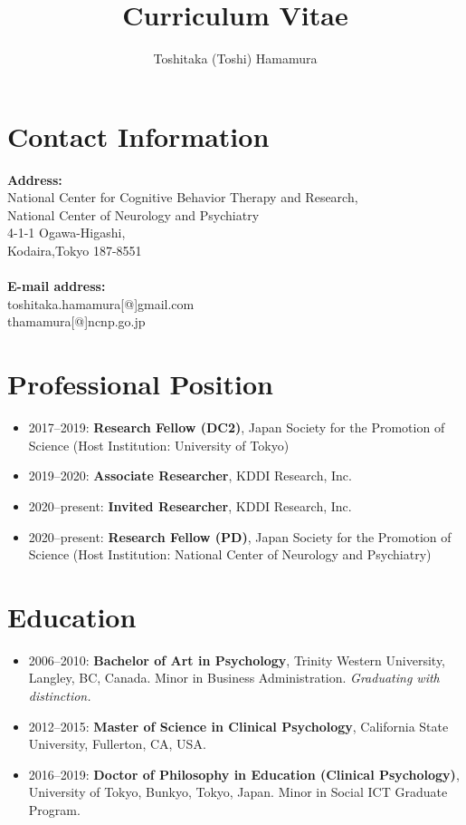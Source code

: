 \documentclass{article}
\begin{document}
\sloppy
\title{Curriculum Vitae}
\author{Toshitaka (Toshi) Hamamura}
\maketitle

\section{Contact Information}
\textbf{Address:}\\ 
National Center for Cognitive Behavior Therapy and Research,\\
National Center of Neurology and Psychiatry\\
4-1-1 Ogawa-Higashi,\\
Kodaira,Tokyo 187-8551\\
\\
\textbf{E-mail address:}\\	
toshitaka.hamamura[@]gmail.com\\
thamamura[@]ncnp.go.jp\\

\section{Professional Position}
\begin{itemize}
	\item 2017--2019: \textbf{Research Fellow (DC2)}, Japan Society for the Promotion of Science (Host Institution: University of Tokyo)
	\item 2019--2020: \textbf{Associate Researcher}, KDDI Research, Inc.
	\item 2020--present: \textbf{Invited Researcher}, KDDI Research, Inc.
	\item 2020--present: \textbf{Research Fellow (PD)}, Japan Society for the Promotion of Science (Host Institution: National Center of Neurology and Psychiatry)
\end{itemize}

\section{Education}
\begin{itemize}
	\item 2006--2010: \textbf{Bachelor of Art in Psychology}, Trinity Western University, Langley, BC, Canada. Minor in Business Administration. \textit{Graduating with distinction.}
	\item 2012--2015: \textbf{Master of Science in Clinical Psychology}, California State University, Fullerton, CA, USA. 
	\item 2016--2019: \textbf{Doctor of Philosophy in Education (Clinical Psychology)}, University of Tokyo, Bunkyo, Tokyo, Japan. Minor in Social ICT Graduate Program.
\end{itemize}
\end{document}
